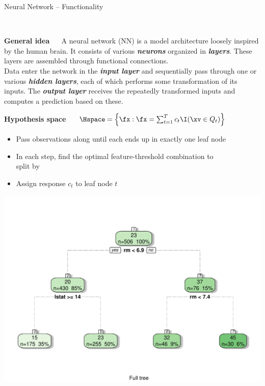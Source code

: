 \documentclass[11pt,compress,t,notes=noshow, xcolor=table]{beamer}
\newcommand{\maketag}[1]{\colorbox{highlightcol}{\textcolor{white}
{\MakeUppercase{#1}}}}
\newcommand{\highlight}[1]{\textcolor{highlightcol}{\textbf{#1}}}
\newcommand{\bfit}[1]{\textbf{\textit{#1}}}
\begin{document}
\begin{frame}{Neural Network -- Functionality}

\footnotesize

\maketag{|UN| SUPERVISED}
\maketag{|Non| parametric}
\maketag{BLACK-BOX}

\medskip

\highlight{General idea} ~~ A neural network (NN) is a model
architecture loosely inspired by the human brain. It consists of various
\bfit{neurons} organized in \bfit{layers}. These layers
are assembled through functional connections. 
\\ Data enter the network in
the \bfit{input layer} and sequentially pass through one or various
\bfit{hidden layers}, each of which performs some transformation of
its inputs. The \bfit{output layer} receives the repeatedly
transformed inputs and computes a prediction based on these.

\medskip
 
\highlight{Hypothesis space} ~~
$\Hspace = \left\{ \fx: \fx = \sum_{t = 1}^T c_t \I(\xv \in Q_t) 
\right\}$

\medskip

\begin{minipage}{0.6\textwidth}
  \begin{itemize}
    \item Pass observations along until each ends up in exactly 
    one leaf node
    \item In each step, find the optimal feature-threshold
    combination to \\ split by
  \item Assign response $c_t$ to leaf node $t$
\end{itemize}

\end{minipage}%
\begin{minipage}{0.4\textwidth}
  \includegraphics[width=\textwidth]{figure/cart.pdf}
\end{minipage}


\end{frame}
\end{document}

